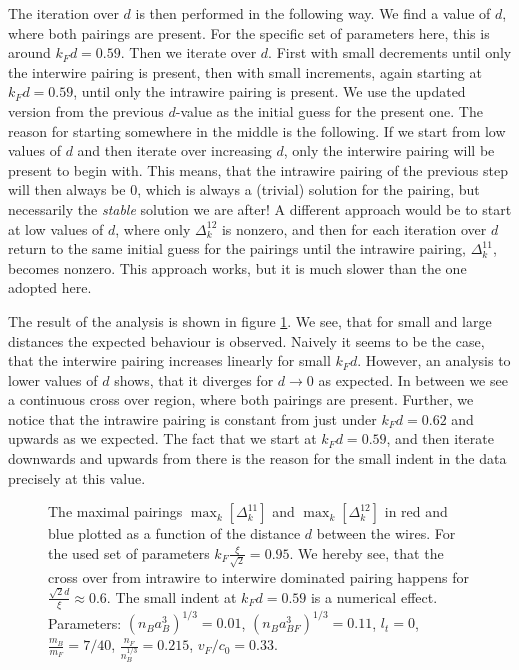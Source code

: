The iteration over $d$ is then performed in the following way. We find a value of $d$, where both pairings are present. For the specific set of parameters here, this is around $k_Fd = 0.59$. Then we iterate over $d$. First with small decrements until only the interwire pairing is present, then with small increments, again starting at $k_Fd = 0.59$, until only the intrawire pairing is present. We use the updated version from the previous $d$-value as the initial guess for the present one. The reason for starting somewhere in the middle is the following. If we start from low values of $d$ and then iterate over increasing $d$, only the interwire pairing will be present to begin with. This means, that the intrawire pairing of the previous step will then always be $0$, which is always a (trivial) solution for the pairing, but necessarily the \textit{stable} solution we are after! A different approach would be to start at low values of $d$, where only $\Delta^{12}_k$ is nonzero, and then for each iteration over $d$ return to the same initial guess for the pairings until the intrawire pairing, $\Delta^{11}_k$, becomes nonzero. This approach works, but it is much slower than the one adopted here.  

The result of the analysis is shown in figure \ref{fig.maximalpairingddepend}. We see, that for small and large distances the expected behaviour is observed. Naively it seems to be the case, that the interwire pairing increases linearly for small $k_Fd$. However, an analysis to lower values of $d$ shows, that it diverges for $d \to 0$ as expected. In between we see a continuous cross over region, where both pairings are present. Further, we notice that the intrawire pairing is constant from just under $k_Fd = 0.62$ and upwards as we expected. The fact that we start at $k_Fd =0.59$, and then iterate downwards and upwards from there is the reason for the small indent in the data precisely at this value.

\begin{figure} 
\begin{center}  
  
\caption{The maximal pairings $\max_k\left[\Delta^{11}_k\right]$ and $\max_k\left[\Delta^{12}_k\right]$ in red and blue plotted as a function of the distance $d$ between the wires. For the used set of parameters $k_F\frac{\xi}{\sqrt{2}} = 0.95$. We hereby see, that the cross over from intrawire to interwire dominated pairing happens for $\frac{\sqrt{2}d}{\xi} \approx 0.6$. The small indent at $k_Fd = 0.59$ is a numerical effect. Parameters: $(n_Ba_B^3)^{1/3} = 0.01$, $(n_Ba_{BF}^3)^{1/3} = 0.11$, $l_t = 0$, $\frac{m_B}{m_F} = 7/40$, $\frac{n_F}{n_B^{1/3}} = 0.215$, $v_F/c_0 = 0.33$. }  
\label{fig.maximalpairingddepend}  
\end{center}    
\end{figure}

